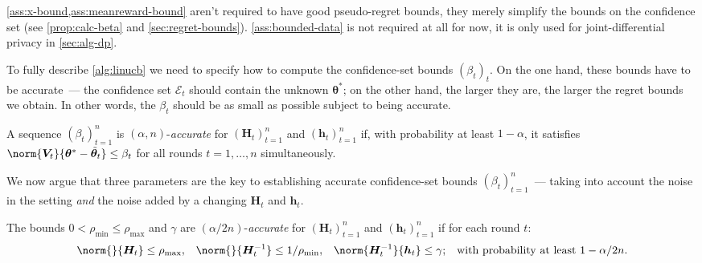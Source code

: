\documentclass{article}
\renewcommand{\vec}[1]{\bm{#1}}
\newcommand{\inv}[1]{#1^{-1}}
\newcommand{\E}{\mathcal{E}}
\begin{document}
\cref{ass:x-bound,ass:meanreward-bound} aren't required to have good pseudo-regret bounds, they merely simplify the bounds on the confidence set (see \cref{prop:calc-beta} and \cref{sec:regret-bounds}). \cref{ass:bounded-data} is not required at all for now, it is only used for joint-differential privacy in \cref{sec:alg-dp}.



To fully describe \cref{alg:linucb} we need to specify how to compute the confidence-set bounds $(\beta_t)_t$. On the one hand, these bounds have to be accurate~--- the confidence set $\E_t$ should contain the unknown $\vec\theta^*$; on the other hand, the larger they are, the larger the regret bounds we obtain.
In other words, the $\beta_t$ should be as small as possible subject to being accurate.

\begin{definition}\label{def:accurate-beta}
  A sequence $(\beta_t)_{t=1}^n$ is $(\alpha, n)$-\emph{accurate} for
  $(\vec H_t)_{t=1}^n$ and $(\vec h_t)_{t=1}^n$ if, with probability at
  least $1-\alpha$, it satisfies
  $\norm{\vec V_t}{\vec\theta^* - \tilde{\vec\theta}_t} \le \beta_t$
  for all rounds $t=1,\dotsc,n$ simultaneously.
\end{definition}
\vspace{-\parskip}
We now argue that three parameters are the key to establishing accurate confidence-set bounds $(\beta_t)_{t=1}^n$~--- taking into account the noise in the setting \emph{and} the noise added by a changing $\vec H_t$ and $\vec h_t$.

\begin{definition}\label{def:accurate-params}
  The bounds $0 < \rho_{\min} \le \rho_{\max}$ and $\gamma$ are
  $(\alpha/2n)$-\emph{accurate} for $(\vec H_t)_{t=1}^n$ and
  $(\vec h_t)_{t=1}^n$ if for each round $t$:
  \begin{align*}
    \norm{}{\vec H_t} &\le \rho_{\max},
    &\norm{}{\inv{\vec H_t}} &\le 1/\rho_{\min},
    &\norm{\inv{\vec H_t}}{\vec h_t} &\le \gamma;
    &\text{with probability at least } 1-\alpha/2n.
  \end{align*}
\end{definition}
\end{document}
